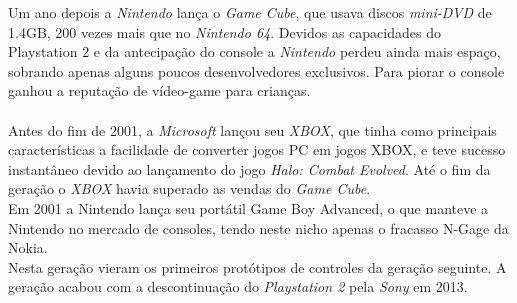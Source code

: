 \documentclass[paper=a4, fontsize=11pt]{scrartcl}	%
\numberwithin{equation}{section}															%
\numberwithin{figure}{section}																%
\numberwithin{table}{section}																%
\begin{document}
Um ano depois a \textit{Nintendo} lança o \textit{Game Cube}, que usava discos \textit{mini-DVD} de 1.4GB, 200 vezes mais que no \textit{Nintendo 64}. Devidos as capacidades do Playstation 2 e da antecipação do console a \textit{Nintendo} perdeu ainda mais espaço, sobrando apenas alguns poucos desenvolvedores exclusivos. Para piorar o console ganhou a reputação de vídeo-game para crianças.\\\\
Antes do fim de 2001, a \textit{Microsoft} lançou seu \textit{XBOX}, que tinha como principais características a facilidade de converter jogos PC em jogos XBOX, e teve sucesso instantâneo devido ao lançamento do jogo \textit{Halo: Combat Evolved}. Até o fim da geração o \textit{XBOX} havia superado as vendas do \textit{Game Cube}.\\
Em 2001 a Nintendo lança seu portátil Game Boy Advanced, o que manteve a Nintendo no mercado de consoles, tendo neste nicho apenas o fracasso N-Gage da Nokia.\\
Nesta geração vieram os primeiros protótipos de controles da geração seguinte.
A geração acabou com a descontinuação do \textit{Playstation 2} pela \textit{Sony} em 2013.
\end{document}
